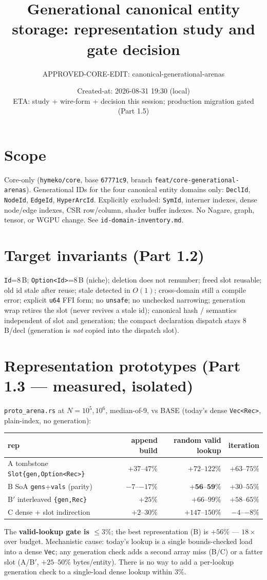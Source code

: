 \documentclass[11pt]{article}
\title{Generational canonical entity storage: representation study and gate decision}
\author{APPROVED-CORE-EDIT: canonical-generational-arenas}
\date{Created-at: 2026-08-31 19:30 (local) \\ ETA: study + wire-form + decision this session; production migration gated (Part 1.5)}
\begin{document}
\maketitle

\section*{Scope}
Core-only (\texttt{hymeko/core}, base \texttt{67771c9}, branch
\texttt{feat/core-generational-arenas}). Generational IDs for the four canonical
entity domains only: \texttt{DeclId}, \texttt{NodeId}, \texttt{EdgeId},
\texttt{HyperArcId}. Explicitly excluded: \texttt{SymId}, interner indexes,
dense node/edge indexes, CSR row/column, shader buffer indexes. No Nagare, graph,
tensor, or WGPU change. See \texttt{id-domain-inventory.md}.

\section*{Target invariants (Part 1.2)}
\texttt{Id}=8\,B; \texttt{Option<Id>}=8\,B (niche); deletion does not renumber;
freed slot reusable; old id stale after reuse; stale detected in $O(1)$;
cross-domain still a compile error; explicit \texttt{u64} FFI form; no
\texttt{unsafe}; no unchecked narrowing; generation wrap retires the slot (never
revives a stale id); canonical hash / semantics independent of slot and
generation; the compact declaration dispatch stays 8\,B/decl (generation is
\emph{not} copied into the dispatch slot).

\section*{Representation prototypes (Part 1.3 --- measured, isolated)}
\texttt{proto\_arena.rs} at $N=10^5,10^6$, median-of-9, vs BASE (today's dense
\texttt{Vec<Rec>}, plain-index, no generation):
\begin{longtable}{lrrr}\toprule
rep & append build & random valid lookup & iteration \\\midrule
A tombstone \texttt{Slot\{gen,Option<Rec>\}} & $+37$--$47\%$ & $+72$--$122\%$ & $+63$--$75\%$ \\
B SoA \texttt{gens}+\texttt{vals} (parity) & $-7$--$-17\%$ & $\mathbf{+56}$--$\mathbf{59\%}$ & $+30$--$55\%$ \\
B$'$ interleaved \texttt{\{gen,Rec\}} & $+25\%$ & $+66$--$99\%$ & $+58$--$65\%$ \\
C dense + slot indirection & $+2$--$30\%$ & $+147$--$150\%$ & $-4$--$-8\%$ \\\bottomrule
\end{longtable}
The \textbf{valid-lookup gate is $\leq 3\%$}; the best representation (B) is
$+56\%$ --- $18\times$ over budget. Mechanistic cause: today's lookup is a single
bounds-checked load into a dense \texttt{Vec}; any generation check adds a second
array miss (B/C) or a fatter slot (A/B$'$, $+25$--$50\%$ bytes/entity). There is
no way to add a per-lookup generation check to a single-load dense lookup within
$3\%$.
\end{document}
